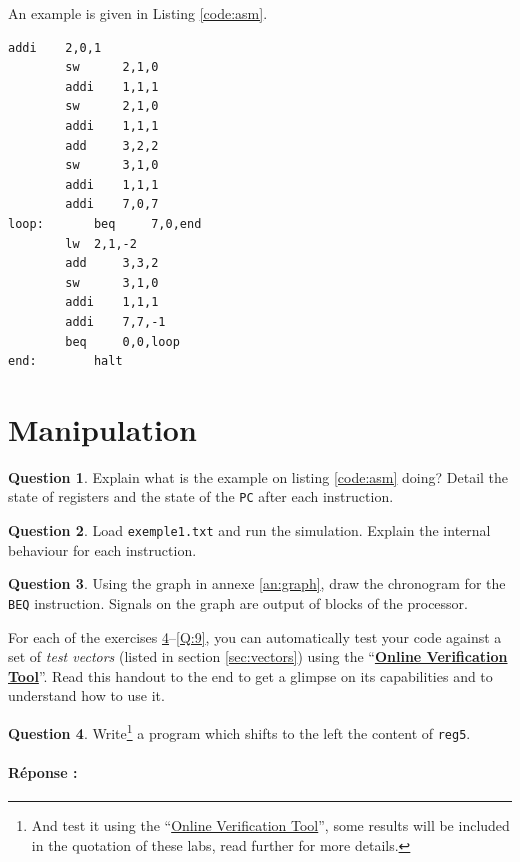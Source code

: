\documentclass[10pt,a4paper]{article}
\theoremstyle{definition}%
\newtheorem{Q}{Question}[] %
\newcommand{\reponse}[1]{%
	\ifthenelse {\boolean{corrige}} {\paragraph{Réponse :} #1} {}
 }
\newcommand{\reg}[1]{\texttt{reg#1}}
\newcommand{\ovt}{\href{https://risc16.weegee.fr}{Online Verification Tool}}
\begin{document}
An example is given in Listing \vref{code:asm}.

\lstset{numbers=left, numberstyle=\tiny, stepnumber=5, numbersep=5pt, captionpos=b,style=customasm}
\begin{lstlisting}[float=h!,caption=Example code,label=code:asm,style=customasm]
		addi 	2,0,1	
		sw   	2,1,0
		addi 	1,1,1
		sw   	2,1,0			
		addi 	1,1,1
		add  	3,2,2
		sw   	3,1,0
		addi 	1,1,1
		addi 	7,0,7	
loop: 		beq  	7,0,end
		lw	2,1,-2
		add 	3,3,2	
		sw   	3,1,0
		addi 	1,1,1
		addi 	7,7,-1
		beq  	0,0,loop
end: 		halt
\end{lstlisting}

\newpage

\section{Manipulation}




\begin{Q}
Explain what is the example on listing \vref{code:asm} doing? Detail the state of registers and the state of the \verb!PC! after each instruction.
\end{Q}

\begin{Q}
Load \verb!exemple1.txt! and run the simulation. Explain the internal behaviour for each instruction.
\end{Q}

\begin{Q}
Using the graph in annexe \vref{an:graph}, draw the chronogram for the \verb!BEQ! instruction. Signals on the graph are output of blocks of the processor.
\end{Q}


For each of the exercises \ref{Q:4}--\ref{Q:9}, you can automatically test your code against a set of \textit{test vectors} (listed in section \ref{sec:vectors}) using the ``\textbf{\ovt}''.
Read this handout to the end to get a glimpse on its capabilities and to understand how to use it.
\begin{Q}
	\label{Q:4}
	Write\footnote{\label{assign}And test it using the ``\ovt{}'', some results will be included in the quotation of these labs, read further for more details.} a program which shifts to the left the content of \reg{5}.
	\reponse{}%
\end{Q}
\end{document}
